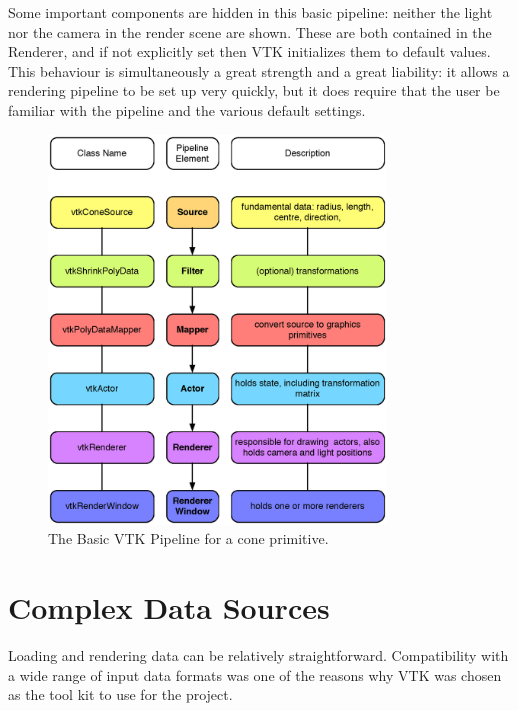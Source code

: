 \documentclass[MSc,paper=a4,pagesize=auto]{icldt}
\begin{document}
Some important components are hidden in this basic pipeline: neither the light nor the camera in the render scene are	 shown. These are both contained in the Renderer, and if not explicitly set then VTK initializes them to default values. This behaviour is simultaneously a great strength and a great liability: it allows a rendering pipeline to be set up very quickly, but it does require that the user be familiar with the pipeline and the various default settings.

\begin{figure}[htbp!]
    \centering
    \includegraphics[width=0.8\textwidth]{resources/vtk_pipeline}
    \caption{The Basic VTK Pipeline for a cone primitive.}
    \label{fig:vtk_pipeline}
\end{figure}


\section{Complex Data Sources}
Loading and rendering data can be relatively straightforward. Compatibility with a wide range of input data formats was one of the reasons why VTK was chosen as the tool kit to use for the project.
\end{document}
